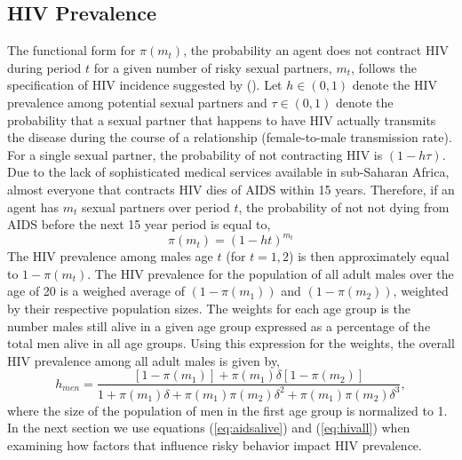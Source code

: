 \documentclass[12pt]{article}
\newcommand{\beq}{\begin{equation}}
\newcommand{\eeq}{\end{equation}}
\newcommand{\citee}[1]{\citename{#1} (\citeyear{#1})}
\begin{document}
\subsection{HIV Prevalence}
The functional form for $\pi(m_t)$, the probability an agent does not contract HIV during period $t$ for a given number of risky sexual partners, $m_t$, follows the specification of HIV incidence suggested by \citee{eoQJE}.  Let $h\in(0,1)$ denote the HIV prevalence among potential sexual partners and $\tau \in (0,1)$ denote the probability that a sexual partner that happens to have HIV actually transmits the disease during the course of a relationship (female-to-male transmission rate).  For a single sexual partner, the probability of not contracting HIV is $(1-h\tau)$.  Due to the lack of sophisticated medical services available in sub-Saharan Africa, almost everyone that contracts HIV dies of AIDS within 15 years.  Therefore, if an agent has $m_t$ sexual partners over period $t$, the probability of not not dying from AIDS before the next 15 year period is equal to,
\beq \label{eq:aidsalive} \pi(m_t) = (1-ht)^{m_t} \eeq
The HIV prevalence among males age $t$ (for $t=1,2$) is then approximately equal to $1-\pi(m_t)$.  The HIV prevalence for the population of all adult males over the age of 20 is a weighed average of $(1-\pi(m_1))$ and $(1-\pi(m_2))$, weighted by their respective population sizes.  The weights for each age group is the number males still alive in a given age group expressed as a percentage of the total men alive in all age groups.  Using this expression for the weights, the overall HIV prevalence among all adult males is given by,
\beq \label{eq:hivall} h_{men} = \frac{\left[1-\pi(m_1)\right] + \pi(m_1)\delta\left[1-\pi(m_2)\right]}{1 + \pi(m_1)\delta + \pi(m_1)\pi(m_2)\delta^2 + \pi(m_1)\pi(m_2)\delta^3}, \eeq
where the size of the population of men in the first age group is normalized to 1.  In the next section we use equations (\ref{eq:aidsalive}) and (\ref{eq:hivall}) when examining how factors that influence risky behavior impact HIV prevalence.
\end{document}
